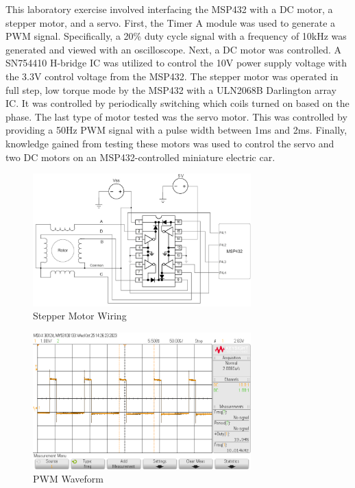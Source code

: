 \documentclass[CMPE]{KGCOEReport}
\begin{document}
\maketitle

This laboratory exercise involved interfacing the MSP432 with a DC motor, a stepper motor, and a servo. First, the Timer A module was used to generate a PWM signal. Specifically, a 20\% duty cycle signal with a frequency of 10kHz was generated and viewed with an oscilloscope. Next, a DC motor was controlled. A SN754410 H-bridge IC was utilized to control the 10V power supply voltage with the 3.3V control voltage from the MSP432. The stepper motor was operated in full step, low torque mode by the MSP432 with a ULN2068B Darlington array IC. It was controlled by periodically switching which coils turned on based on the phase. The last type of motor tested was the servo motor. This was controlled by providing a 50Hz PWM signal with a pulse width between 1ms and 2ms. Finally, knowledge gained from testing these motors was used to control the servo and two DC motors on an MSP432-controlled miniature electric car.

\begin{figure}[H]
    \centering
    \includegraphics[width=0.75\textwidth]{StepperWiring.png}
    \caption{Stepper Motor Wiring}
    \label{fig:ServoWiring}
\end{figure}

\begin{figure}[H]
    \centering
    \includegraphics[width=0.75\textwidth]{PWM.png}
    \caption{PWM Waveform}
    \label{fig:pwm}
\end{figure}
\end{document}
